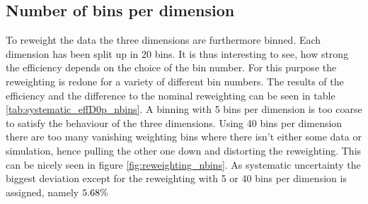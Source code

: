\subsection{Number of bins per dimension}
To reweight the data the three dimensions are furthermore binned.
Each dimension has been split up in 20 bins.
It is thus interesting to see, how strong the efficiency depends on the choice of the bin number.
For this purpose the reweighting is redone for a variety of different bin numbers.
The results of the efficiency \effDp and the difference to the nominal reweighting can be seen in table \ref{tab:systematic_effD0p_nbins}.
A binning with 5 bins per dimension is too coarse to satisfy the behaviour of the three dimensions.
Using 40 bins per dimension there are too many vanishing weighting bins where there isn't either some data or simulation, hence pulling the other one down and distorting the reweighting.
This can be nicely seen in figure \ref{fig:reweighting_nbins}.
As systematic uncertainty the biggest deviation except for the reweighting with 5 or 40 bins per dimension is assigned, namely $5.68\%$

